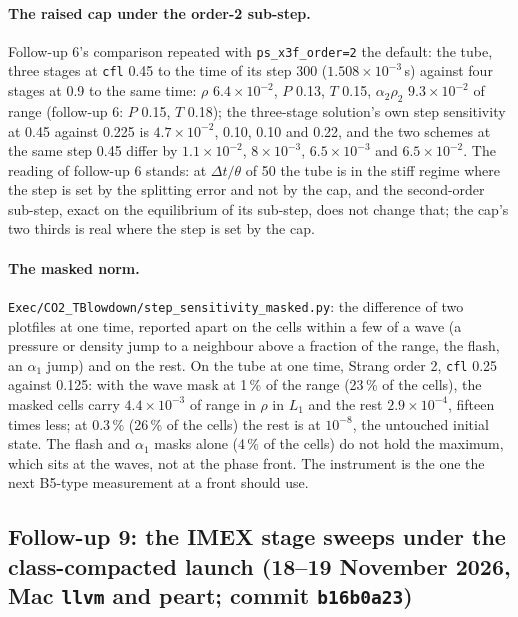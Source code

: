 \documentclass[11pt,a4paper]{article}
\newcommand{\code}[1]{\texttt{\small #1}}
\newcommand{\Dt}{\Delta t}
\begin{document}
\paragraph{The raised cap under the order-2 sub-step.}  Follow-up 6's
comparison repeated with \code{ps\_x3f\_order=2} the default: the tube,
three stages at \code{cfl} 0.45 to the time of its step 300
($1.508\times10^{-3}$\,s) against four stages at 0.9 to the same time:
$\rho$ $6.4\times10^{-2}$, $P$ 0.13, $T$ 0.15, $\alpha_2\rho_2$
$9.3\times10^{-2}$ of range (follow-up 6: $P$ 0.15, $T$ 0.18); the
three-stage solution's own step sensitivity at 0.45 against 0.225 is
$4.7\times10^{-2}$, 0.10, 0.10 and 0.22, and the two schemes at the
same step 0.45 differ by $1.1\times10^{-2}$, $8\times10^{-3}$,
$6.5\times10^{-3}$ and $6.5\times10^{-2}$.  The reading of follow-up 6
stands: at $\Dt/\theta$ of 50 the tube is in the stiff regime where the
step is set by the splitting error and not by the cap, and the
second-order sub-step, exact on the equilibrium of its sub-step, does
not change that; the cap's two thirds is real where the step is set by
the cap.

\paragraph{The masked norm.}  \code{Exec/CO2\_TBlowdown/step\_sensitivity\_masked.py}:
the difference of two plotfiles at one time, reported apart on the
cells within a few of a wave (a pressure or density jump to a neighbour
above a fraction of the range, the flash, an $\alpha_1$ jump) and on the
rest.  On the tube at one time, Strang order 2, \code{cfl} 0.25 against
0.125: with the wave mask at 1\,\% of the range (23\,\% of the cells),
the masked cells carry $4.4\times10^{-3}$ of range in $\rho$ in $L_1$
and the rest $2.9\times10^{-4}$, fifteen times less; at 0.3\,\% (26\,\%
of the cells) the rest is at $10^{-8}$, the untouched initial state.
The flash and $\alpha_1$ masks alone (4\,\% of the cells) do not hold
the maximum, which sits at the waves, not at the phase front.  The
instrument is the one the next B5-type measurement at a front should
use.


\subsection{Follow-up 9: the IMEX stage sweeps under the class-compacted launch (18--19 November 2026, Mac \code{llvm} and peart; commit \code{b16b0a23})}
\label{sec:fu9}
\end{document}
